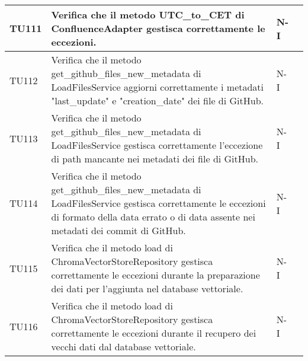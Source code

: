 \begin{table}[h!]
\begin{tabularx}{\textwidth}{|p{}|X|p{}|p{}|}
    TU111 & Verifica che il metodo UTC\_to\_CET di ConfluenceAdapter gestisca correttamente le eccezioni. &  N-I \\ \hline
    TU112 & Verifica che il metodo get\_github\_files\_new\_metadata di LoadFilesService aggiorni correttamente i metadati "last\_update" e "creation\_date" dei file di GitHub. &  N-I \\ \hline
    TU113 & Verifica che il metodo get\_github\_files\_new\_metadata di LoadFilesService gestisca correttamente l'eccezione di path mancante nei metadati dei file di GitHub. &  N-I \\ \hline
    TU114 & Verifica che il metodo get\_github\_files\_new\_metadata di LoadFilesService gestisca correttamente le eccezioni di formato della data errato o di data assente nei metadati dei commit di GitHub. &  N-I \\ \hline
    TU115 & Verifica che il metodo load di ChromaVectorStoreRepository gestisca correttamente le eccezioni durante la preparazione dei dati per l'aggiunta nel database vettoriale. &  N-I \\ \hline
    TU116 & Verifica che il metodo load di ChromaVectorStoreRepository gestisca correttamente le eccezioni durante il recupero dei vecchi dati dal database vettoriale. &  N-I \\ \hline


    \end{tabularx}
\end{table}

\newpage

